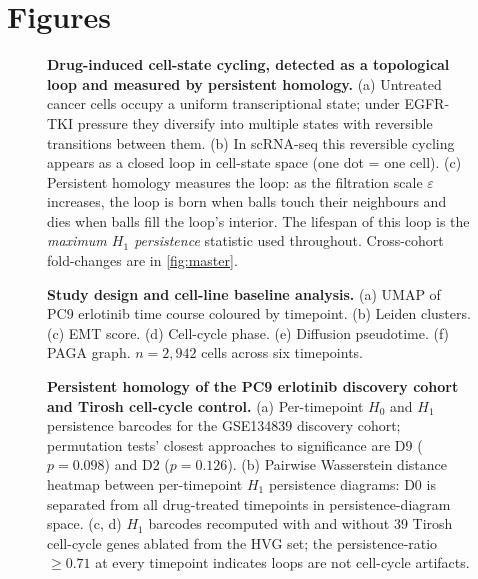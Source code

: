 %

\section*{Figures}

\begin{figure}
  \caption{\textbf{Drug-induced cell-state cycling, detected as a
  topological loop and measured by persistent homology.}
  (a) Untreated cancer cells occupy a uniform transcriptional state;
  under EGFR-TKI pressure they diversify into multiple states with
  reversible transitions between them.
  (b) In scRNA-seq this reversible cycling appears as a closed loop
  in cell-state space (one dot = one cell).
  (c) Persistent homology measures the loop: as the filtration scale
  $\varepsilon$ increases, the loop is born when balls touch their
  neighbours and dies when balls fill the loop's interior. The
  lifespan of this loop is the \emph{maximum $H_1$ persistence}
  statistic used throughout. Cross-cohort fold-changes are in
  \cref{fig:master}.}
  \label{fig:concept}
\end{figure}

\begin{figure}
  \caption{\textbf{Study design and cell-line baseline analysis.}
  (a) UMAP of PC9 erlotinib time course coloured by timepoint.
  (b) Leiden clusters. (c) EMT score. (d) Cell-cycle phase.
  (e) Diffusion pseudotime. (f) PAGA graph. $n = 2{,}942$ cells
  across six timepoints.}
  \label{fig:study_overview}
\end{figure}

\begin{figure}
  \caption{\textbf{Persistent homology of the PC9 erlotinib discovery
  cohort and Tirosh cell-cycle control.}
  (a) Per-timepoint $H_0$ and $H_1$ persistence barcodes for the
  GSE134839 discovery cohort; permutation tests' closest approaches
  to significance are D9 ($p = 0.098$) and D2 ($p = 0.126$).
  (b) Pairwise Wasserstein distance heatmap between per-timepoint
  $H_1$ persistence diagrams: D0 is separated from all drug-treated
  timepoints in persistence-diagram space.
  (c, d) $H_1$ barcodes recomputed with and without 39 Tirosh
  cell-cycle genes ablated from the HVG set; the persistence-ratio
  $\geq 0.71$ at every timepoint indicates loops are not cell-cycle
  artifacts.}
  \label{fig:discovery_ph}
\end{figure}

